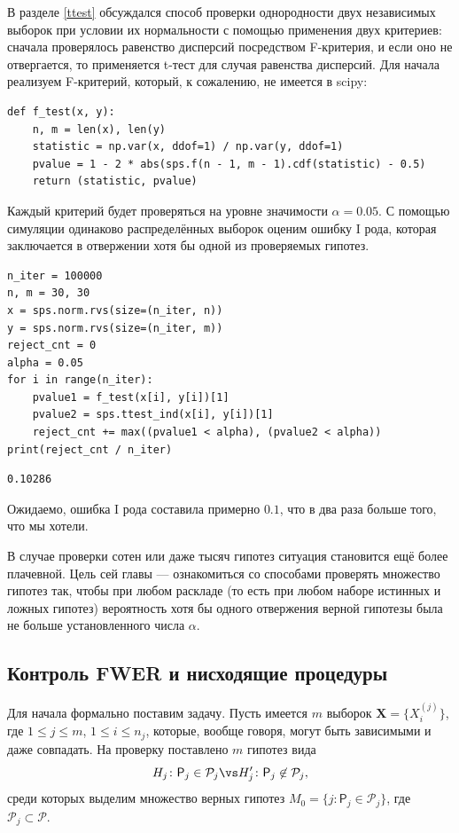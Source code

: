\begin{example}
    В разделе \ref{ttest} обсуждался способ проверки однородности двух независимых выборок при условии их нормальности с помощью применения двух критериев: сначала проверялось равенство дисперсий посредством F-критерия, и если оно не отвергается, то применяется t-тест для случая равенства дисперсий. Для начала реализуем F-критерий, который, к сожалению, не имеется в scipy:
    \begin{verbatim}
def f_test(x, y):
    n, m = len(x), len(y)
    statistic = np.var(x, ddof=1) / np.var(y, ddof=1)
    pvalue = 1 - 2 * abs(sps.f(n - 1, m - 1).cdf(statistic) - 0.5)
    return (statistic, pvalue)
    \end{verbatim}
    Каждый критерий будет проверяться на уровне значимости $\alpha = 0.05$. С помощью симуляции одинаково распределённых выборок оценим ошибку I рода, которая заключается в отвержении хотя бы одной из проверяемых гипотез.
    \begin{verbatim}
n_iter = 100000
n, m = 30, 30
x = sps.norm.rvs(size=(n_iter, n))
y = sps.norm.rvs(size=(n_iter, m))
reject_cnt = 0
alpha = 0.05
for i in range(n_iter):
    pvalue1 = f_test(x[i], y[i])[1]
    pvalue2 = sps.ttest_ind(x[i], y[i])[1]
    reject_cnt += max((pvalue1 < alpha), (pvalue2 < alpha))
print(reject_cnt / n_iter)
    \end{verbatim}
    \begin{lstlisting}
0.10286
    \end{lstlisting}
Ожидаемо, ошибка I рода составила примерно $0.1$, что в два раза больше того, что мы хотели.
\end{example}
В случае проверки сотен или даже тысяч гипотез ситуация становится ещё более плачевной. Цель сей главы --- ознакомиться со способами проверять множество гипотез так, чтобы при любом раскладе (то есть при любом наборе истинных и ложных гипотез) вероятность хотя бы одного отвержения верной гипотезы была не больше установленного числа $\alpha$.

\subsection{Контроль FWER и нисходящие процедуры}

Для начала формально поставим задачу. Пусть имеется $m$ выборок $\mathbf X = \{X_i^{(j)}\}$, где $1 \le j \le m$, $1 \le i \le n_j$, которые, вообще говоря, могут быть зависимыми и даже совпадать. На проверку поставлено $m$ гипотез вида
\[
H_j\colon \mathsf{P}_{j} \in \mathcal{P}_j \vs H_j'\colon \mathsf{P}_{j} \not\in \mathcal{P}_j,
\]
среди которых выделим множество верных гипотез $M_0 = \{j\colon \mathsf{P}_{j} \in \mathcal{P}_j\}$, где $\mathcal{P}_j \subset \mathcal{P}$.

